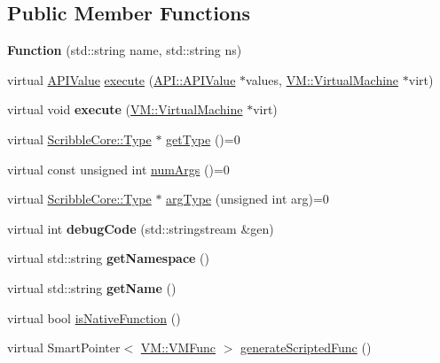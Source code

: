 \subsection*{Public Member Functions}
\begin{DoxyCompactItemize}
\item 
\hypertarget{class_a_p_i_1_1_function_a1e90ad6e08814d4035864f490d72feeb}{{\bfseries Function} (std\-::string name, std\-::string ns)}\label{class_a_p_i_1_1_function_a1e90ad6e08814d4035864f490d72feeb}

\item 
virtual \hyperlink{class_a_p_i_1_1_a_p_i_value}{A\-P\-I\-Value} \hyperlink{class_a_p_i_1_1_function_ac3bc5de6ce095a4c8474525ef181c4af}{execute} (\hyperlink{class_a_p_i_1_1_a_p_i_value}{A\-P\-I\-::\-A\-P\-I\-Value} $\ast$values, \hyperlink{class_v_m_1_1_virtual_machine}{V\-M\-::\-Virtual\-Machine} $\ast$virt)
\item 
\hypertarget{class_a_p_i_1_1_function_a5acc2022cdbd5fe47c1a04769a1d8cf4}{virtual void {\bfseries execute} (\hyperlink{class_v_m_1_1_virtual_machine}{V\-M\-::\-Virtual\-Machine} $\ast$virt)}\label{class_a_p_i_1_1_function_a5acc2022cdbd5fe47c1a04769a1d8cf4}

\item 
virtual \hyperlink{class_scribble_core_1_1_type}{Scribble\-Core\-::\-Type} $\ast$ \hyperlink{class_a_p_i_1_1_function_a85b0b2ee88d3ac61a0e77f94e06445b1}{get\-Type} ()=0
\item 
virtual const unsigned int \hyperlink{class_a_p_i_1_1_function_ae56761ad4c849c05e12cb4cd02583c77}{num\-Args} ()=0
\item 
virtual \hyperlink{class_scribble_core_1_1_type}{Scribble\-Core\-::\-Type} $\ast$ \hyperlink{class_a_p_i_1_1_function_a531806ea8476e8aa396eb98ce81e713b}{arg\-Type} (unsigned int arg)=0
\item 
\hypertarget{class_a_p_i_1_1_function_a1d90140ae782b05a9ffd63ffb96d8909}{virtual int {\bfseries debug\-Code} (std\-::stringstream \&gen)}\label{class_a_p_i_1_1_function_a1d90140ae782b05a9ffd63ffb96d8909}

\item 
\hypertarget{class_a_p_i_1_1_function_a5e873f1585e43b8b94fb94632875b586}{virtual std\-::string {\bfseries get\-Namespace} ()}\label{class_a_p_i_1_1_function_a5e873f1585e43b8b94fb94632875b586}

\item 
\hypertarget{class_a_p_i_1_1_function_a201d120f73276bcc59bd2590195a5f4e}{virtual std\-::string {\bfseries get\-Name} ()}\label{class_a_p_i_1_1_function_a201d120f73276bcc59bd2590195a5f4e}

\item 
virtual bool \hyperlink{class_a_p_i_1_1_function_a450fc79d97dd8393bf94aead888592c3}{is\-Native\-Function} ()
\item 
virtual Smart\-Pointer$<$ \hyperlink{class_v_m_1_1_v_m_func}{V\-M\-::\-V\-M\-Func} $>$ \hyperlink{class_a_p_i_1_1_function_a133061933b79944d3c2adb08c8d50a71}{generate\-Scripted\-Func} ()
\end{DoxyCompactItemize}
